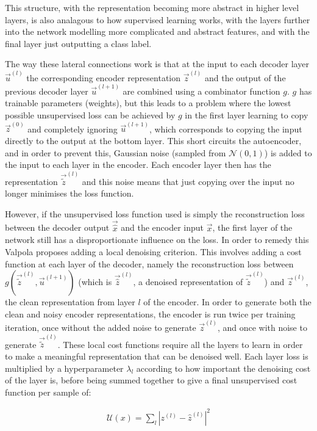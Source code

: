 This structure, with the representation becoming more abstract in higher level layers, is also analagous to how supervised learning works, with the layers 
further into the network modelling more complicated and abstract features, and with the final layer just outputting a class label.

The way these lateral connections work is that
at the input to each decoder layer $\vec{u}^{(l)}$ the corresponding encoder representation $\vec{z}^{(l)}$ and the output of the previous decoder layer $\vec{u}^{(l+1)}$ are combined
using a combinator function $g$. $g$ has trainable parameters (weights), but this leads to a problem where the lowest possible unsupervised loss can be 
achieved by $g$ in the first layer learning to copy $\vec{z}^{(0)}$ and completely ignoring $\vec{u}^{(l+1)}$, which corresponds to copying the input directly to the output at the bottom layer.
This short circuits the autoencoder, and in order to prevent this, Gaussian noise (sampled from $\mathcal{N}(0, 1)$) is added to the input to each layer 
in the encoder. Each encoder layer then has the representation $\vec{\tilde{z}}^{(l)}$ and this noise means that just copying over the input no longer minimises the loss function. 

However, if the unsupervised loss function used is simply the reconstruction loss between the decoder output $\vec{\hat{x}}$ and the encoder input $\vec{x}$, the first layer of 
the network still has a disproportionate
influence on the loss. In order to remedy this Valpola proposes adding a local denoising criterion. This involves adding a cost function at each layer of the decoder,
namely the reconstruction loss between $g(\vec{\tilde{z}}^{(l)}, \vec{u}^{(l+1)})$ (which is $\vec{\hat{z}}^{(l)}$, a denoised representation of $\vec{\tilde{z}}^{(l)}$) and $\vec{z}^{(l)}$, the clean 
representation from layer $l$ of the encoder. In order to generate both the clean and noisy encoder representations, the encoder is run twice per training iteration,
once without the added noise to generate $\vec{z}^{(l)}$, and once with noise to generate $\vec{\tilde{z}}^{(l)}$. These local cost functions require all the layers to learn in order
to make a meaningful representation that can be denoised well. Each layer loss is multiplied by a hyperparameter $\lambda_{l}$ according to how important the denoising cost
of the layer is, before being summed together to give a final unsupervised cost function per sample of:

\begin{align}
  \mathcal{U}(x) = \sum_{l} |z^{(l)} - \hat{z}^{(l)}|^{2}
\end{align}

